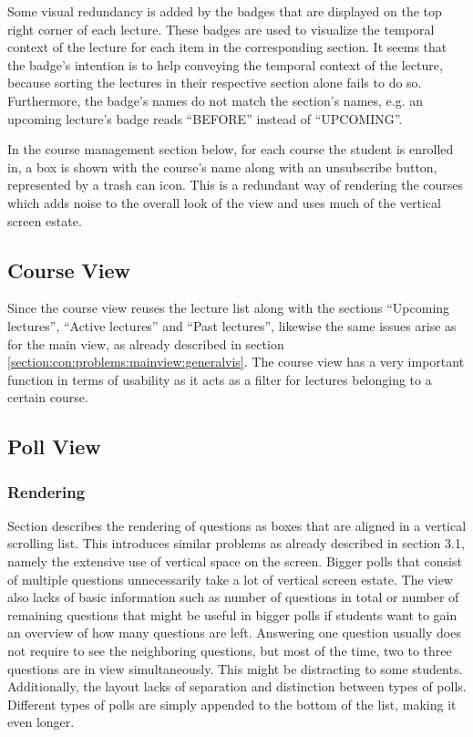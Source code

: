 Some visual redundancy is added by the badges that are displayed on the top right corner of each lecture. These badges are used to visualize the temporal context of the lecture for each item in the corresponding section. It seems that the badge's intention is to help conveying the temporal context of the lecture, because sorting the lectures in their respective section alone fails to do so. Furthermore, the badge's names do not match the section's names, e.g. an upcoming lecture's badge reads “BEFORE” instead of “UPCOMING”. 

In the course management section below, for each course the student is enrolled in, a box is shown with the course's name along with an unsubscribe button, represented by a trash can icon.
\todogrf
This is a redundant way of rendering the courses which adds noise to the overall look of the view and uses much of the vertical screen estate.

\subsection{Course View}

Since the course view reuses the lecture list along with the sections “Upcoming lectures”, “Active lectures” and “Past lectures”, likewise the same issues arise as for the main view, as already described in section \ref{section:con:problems:mainview:generalvis}. 
The course view has a very important function in terms of usability as it acts as a filter for lectures belonging to a certain course. 

\todogrf

\subsection{Poll View}

\subsubsection{Rendering}

Section \todosct describes the rendering of questions as boxes that are aligned in a vertical scrolling list. This introduces similar problems as already described in section 3.1, namely the extensive use of vertical space on the screen. Bigger polls that consist of multiple questions unnecessarily take a lot of vertical screen estate. The view also lacks of basic information such as number of questions in total or number of remaining questions that might be useful in bigger polls if students want to gain an overview of how many questions are left.
Answering one question usually does not require to see the neighboring questions, but most of the time, two to three questions are in view simultaneously. This might be distracting to some students.
Additionally, the layout lacks of separation and distinction between types of polls.
Different types of polls are simply appended to the bottom of the list, making it even longer.

